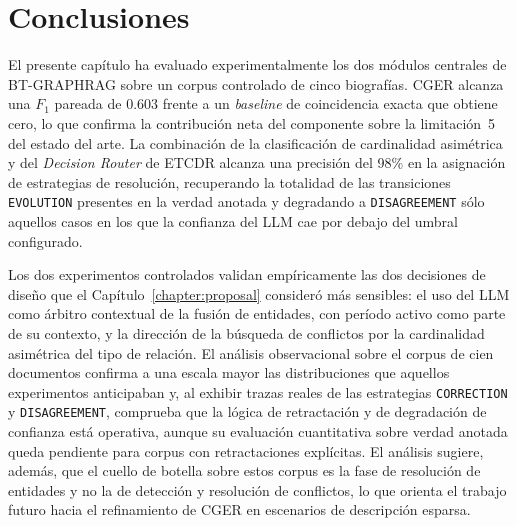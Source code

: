 \section{Conclusiones}\label{sec:eval-conclusions}

El presente capítulo ha evaluado experimentalmente los dos módulos centrales de BT-GRAPHRAG sobre un corpus controlado de cinco biografías. CGER alcanza una $F_1$ pareada de $0.603$ frente a un \emph{baseline} de coincidencia exacta que obtiene cero, lo que confirma la contribución neta del componente sobre la limitación~5 del estado del arte. La combinación de la clasificación de cardinalidad asimétrica y del \emph{Decision Router} de ETCDR alcanza una precisión del 98\% en la asignación de estrategias de resolución, recuperando la totalidad de las transiciones \texttt{EVOLUTION} presentes en la verdad anotada y degradando a \texttt{DISAGREEMENT} sólo aquellos casos en los que la confianza del LLM cae por debajo del umbral configurado.

Los dos experimentos controlados validan empíricamente las dos decisiones de diseño que el Capítulo~\ref{chapter:proposal} consideró más sensibles: el uso del LLM como árbitro contextual de la fusión de entidades, con período activo como parte de su contexto, y la dirección de la búsqueda de conflictos por la cardinalidad asimétrica del tipo de relación. El análisis observacional sobre el corpus de cien documentos confirma a una escala mayor las distribuciones que aquellos experimentos anticipaban y, al exhibir trazas reales de las estrategias \texttt{CORRECTION} y \texttt{DISAGREEMENT}, comprueba que la lógica de retractación y de degradación de confianza está operativa, aunque su evaluación cuantitativa sobre verdad anotada queda pendiente para corpus con retractaciones explícitas. El análisis sugiere, además, que el cuello de botella sobre estos corpus es la fase de resolución de entidades y no la de detección y resolución de conflictos, lo que orienta el trabajo futuro hacia el refinamiento de CGER en escenarios de descripción esparsa.
